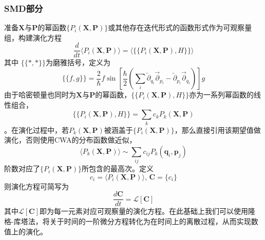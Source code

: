 \subsubsection{SMD部分}
准备$\boldsymbol{X}$与$\boldsymbol{P}$的幂函数$\{P_i(\boldsymbol{X},\boldsymbol{P})\}$或其他存在迭代形式的函数形式作为可观察量组，构建演化方程
\begin{equation}
\frac{d}{d t} \langle P_i(\boldsymbol{X},\boldsymbol{P}) \rangle = \langle \{\{P_i(\boldsymbol{X},\boldsymbol{P}), H\}\} \rangle
\label{Ehrenfest_in_proposal}
\end{equation}
其中 $\{\{ *, * \}\}$为磨雅括号，定义为
 \begin{equation}
	 \{\{f, g\}\}=\frac{2}{\hbar} f \sin \left[\frac{\hbar}{2}\left(\sum_{i} \overleftarrow{\partial}_{q_{i}} \overrightarrow{\partial}_{p_{i}}-\overleftarrow{\partial}_{p_{i}} \overrightarrow{\partial}_{q_{i}}\right)\right] g
\end{equation}
由于哈密顿量也同时为$\boldsymbol{X}$与$\boldsymbol{P}$的幂函数，$\{\{P_i(\boldsymbol{X},\boldsymbol{P}), H\}\}$亦为一系列幂函数的线性组合，
\begin{equation}
\{\{P_i(\boldsymbol{X},\boldsymbol{P}), H\}\} = \sum_k c_k P_k(\boldsymbol{X},\boldsymbol{P})
\end{equation}
。在演化过程中，若$P_k(\boldsymbol{X},\boldsymbol{P})$被涵盖于$\{P_i(\boldsymbol{X},\boldsymbol{P})\}$，那么直接引用该期望值做演化，否则使用CWA的分布函数做近似，
\begin{equation}
\langle P_k(\boldsymbol{X},\boldsymbol{P}) \rangle \sim \sum_{ij} c_{ij} P_k(\boldsymbol{q}_i,\boldsymbol{p}_j)
\end{equation}
阶数对应了$\{P_i(\boldsymbol{X},\boldsymbol{P})\}$所包含的最高次。定义
\begin{equation}
c_i = \langle P_i(\boldsymbol{X},\boldsymbol{P}) \rangle, \, \boldsymbol{C} = \{c_i\}
\end{equation}
则演化方程可简写为
\begin{equation}
\frac{d  \boldsymbol{C}}{d t} = \mathcal{L}[\boldsymbol{C}]
\end{equation}
其中$\mathcal{L}[\boldsymbol{C}]$即为每一元素对应可观察量的演化方程。在此基础上我们可以使用隆格-库塔法，将关于时间的一阶微分方程转化为在时间上的离散过程，从而实现数值上的演化。





